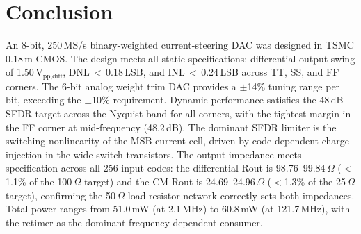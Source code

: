 \documentclass[lettersize,journal]{IEEEtran}
\begin{document}
\section{Conclusion}
\label{sec:conc}

An 8-bit, 250\,MS/s binary-weighted current-steering DAC was designed in TSMC
0.18\,\textmu m CMOS.
The design meets all static specifications: differential output swing of
1.50\,V$_{\text{pp,diff}}$, DNL\,$<$\,0.18\,LSB, and INL\,$<$\,0.24\,LSB
across TT, SS, and FF corners.
The 6-bit analog weight trim DAC provides a $\pm$14\% tuning range per bit,
exceeding the $\pm$10\% requirement.
Dynamic performance satisfies the 48\,dB SFDR target across the Nyquist band
for all corners, with the tightest margin in the FF corner at mid-frequency (48.2\,dB).
The dominant SFDR limiter is the switching nonlinearity of the MSB current cell,
driven by code-dependent charge injection in the wide switch transistors.
The output impedance meets specification across all 256 input codes:
the differential Rout is 98.76–99.84\,$\Omega$ ($<$1.1\% of the 100\,$\Omega$ target)
and the CM Rout is 24.69–24.96\,$\Omega$ ($<$1.3\% of the 25\,$\Omega$ target),
confirming the 50\,$\Omega$ load-resistor network correctly sets both impedances.
Total power ranges from 51.0\,mW (at 2.1\,MHz) to 60.8\,mW (at 121.7\,MHz),
with the retimer as the dominant frequency-dependent consumer.

\end{document}
